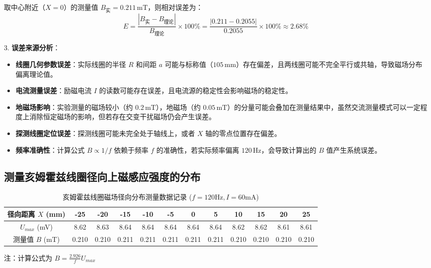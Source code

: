 \documentclass[11pt]{article}
\begin{document}
取中心附近（$X=0$）的测量值 $B_{\text{实}} = 0.211\,\text{mT}$，则相对误差为：
\begin{equation}
    E = \frac{|B_{\text{实}} - B_{\text{理论}}|}{B_{\text{理论}}} \times 100\% = \frac{|0.211 - 0.2055|}{0.2055} \times 100\% \approx 2.68\%
\end{equation}

3. \textbf{误差来源分析}：
\begin{itemize}
    \item \textbf{线圈几何参数误差}：实际线圈的半径 $R$ 和间距 $a$ 可能与标称值（$105\,\text{mm}$）存在偏差，且两线圈可能不完全平行或共轴，导致磁场分布偏离理论值。
    \item \textbf{电流测量误差}：励磁电流 $I$ 的读数可能存在误差，且电流源的稳定性会影响磁场的稳定性。
    \item \textbf{地磁场影响}：实验测量的磁场较小（约 $0.2\,\text{mT}$），地磁场（约 $0.05\,\text{mT}$）的分量可能会叠加在测量结果中，虽然交流测量模式可以一定程度上消除恒定磁场的影响，但若存在交变干扰磁场仍会产生误差。
    \item \textbf{探测线圈定位误差}：探测线圈可能未完全处于轴线上，或者 $X$ 轴的零点位置存在偏差。
    \item \textbf{频率准确性}：计算公式 $B \propto 1/f$ 依赖于频率 $f$ 的准确性，若实际频率偏离 $120\,\text{Hz}$，会导致计算出的 $B$ 值产生系统误差。
\end{itemize}

\subsection{测量亥姆霍兹线圈径向上磁感应强度的分布}
\begin{table}[htbp]
    \centering
    \caption{亥姆霍兹线圈磁场径向分布测量数据记录 ($f=120\text{Hz}, I=60\text{mA}$)}
    \label{tab:helmholtz_radial}
    \begin{tabular}{cccccccccccc}
        \toprule
        径向距离 $X$ (mm) & -25 & -20 & -15 & -10 & -5 & 0 & 5 & 10 & 15 & 20 & 25 \\
        \midrule
        $U_{max}$ (mV) & 8.62 & 8.63 & 8.64 & 8.64 & 8.64 & 8.64 & 8.64 & 8.62 & 8.62 & 8.61 & 8.61 \\
        测量值 $B$ (mT) & 0.210 & 0.210 & 0.211 & 0.211 & 0.211 & 0.211 & 0.211 & 0.210 & 0.210 & 0.210 & 0.210 \\
        \bottomrule
    \end{tabular}
    
    \vspace{0.5em}
    \footnotesize{注：计算公式为 $B = \frac{2.926}{f} U_{max}$}
\end{table}
\end{document}
